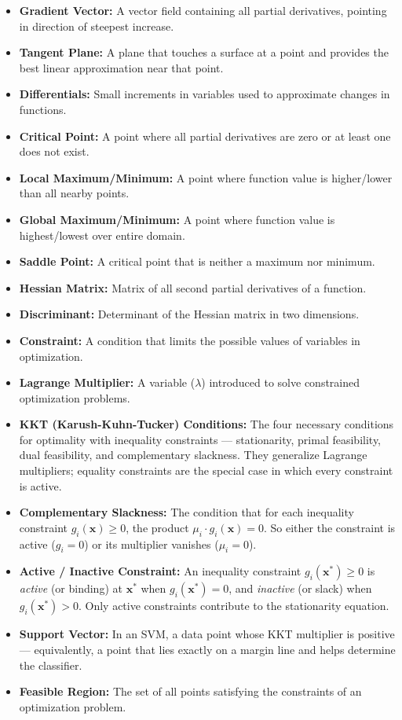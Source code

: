\begin{itemize}
    \item \textbf{Gradient Vector:} A vector field containing all partial derivatives, pointing in direction of steepest increase.
    \item \textbf{Tangent Plane:} A plane that touches a surface at a point and provides the best linear approximation near that point.
    \item \textbf{Differentials:} Small increments in variables used to approximate changes in functions.
    \item \textbf{Critical Point:} A point where all partial derivatives are zero or at least one does not exist.
    \item \textbf{Local Maximum/Minimum:} A point where function value is higher/lower than all nearby points.
    \item \textbf{Global Maximum/Minimum:} A point where function value is highest/lowest over entire domain.
    \item \textbf{Saddle Point:} A critical point that is neither a maximum nor minimum.
    \item \textbf{Hessian Matrix:} Matrix of all second partial derivatives of a function.
    \item \textbf{Discriminant:} Determinant of the Hessian matrix in two dimensions.
    \item \textbf{Constraint:} A condition that limits the possible values of variables in optimization.
    \item \textbf{Lagrange Multiplier:} A variable ($\lambda$) introduced to solve constrained optimization problems.
    \item \textbf{KKT (Karush-Kuhn-Tucker) Conditions:} The four necessary conditions for optimality with inequality constraints --- stationarity, primal feasibility, dual feasibility, and complementary slackness. They generalize Lagrange multipliers; equality constraints are the special case in which every constraint is active.
    \item \textbf{Complementary Slackness:} The condition that for each inequality constraint $g_i(\mathbf{x}) \geq 0$, the product $\mu_i \cdot g_i(\mathbf{x}) = 0$. So either the constraint is active ($g_i = 0$) or its multiplier vanishes ($\mu_i = 0$).
    \item \textbf{Active / Inactive Constraint:} An inequality constraint $g_i(\mathbf{x}^*) \geq 0$ is \textit{active} (or binding) at $\mathbf{x}^*$ when $g_i(\mathbf{x}^*) = 0$, and \textit{inactive} (or slack) when $g_i(\mathbf{x}^*) > 0$. Only active constraints contribute to the stationarity equation.
    \item \textbf{Support Vector:} In an SVM, a data point whose KKT multiplier is positive --- equivalently, a point that lies exactly on a margin line and helps determine the classifier.
    \item \textbf{Feasible Region:} The set of all points satisfying the constraints of an optimization problem.

\end{itemize}


